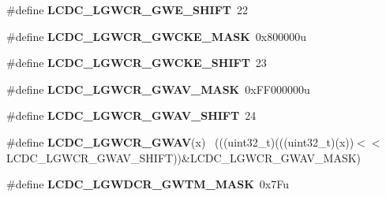 \begin{DoxyCompactItemize}
\item 
\hypertarget{group___l_c_d_c___register___masks_gac7cd7620653ddb327ec89e6070483ade}{}\#define {\bfseries L\+C\+D\+C\+\_\+\+L\+G\+W\+C\+R\+\_\+\+G\+W\+E\+\_\+\+S\+H\+I\+F\+T}~22\label{group___l_c_d_c___register___masks_gac7cd7620653ddb327ec89e6070483ade}

\item 
\hypertarget{group___l_c_d_c___register___masks_ga12aedf8fd9efa6392c6b3d59ccfdbf85}{}\#define {\bfseries L\+C\+D\+C\+\_\+\+L\+G\+W\+C\+R\+\_\+\+G\+W\+C\+K\+E\+\_\+\+M\+A\+S\+K}~0x800000u\label{group___l_c_d_c___register___masks_ga12aedf8fd9efa6392c6b3d59ccfdbf85}

\item 
\hypertarget{group___l_c_d_c___register___masks_ga6d308a14743182b61fa185c65b962bfd}{}\#define {\bfseries L\+C\+D\+C\+\_\+\+L\+G\+W\+C\+R\+\_\+\+G\+W\+C\+K\+E\+\_\+\+S\+H\+I\+F\+T}~23\label{group___l_c_d_c___register___masks_ga6d308a14743182b61fa185c65b962bfd}

\item 
\hypertarget{group___l_c_d_c___register___masks_ga1eb39ddae758eda0f99e646c0cd37b7f}{}\#define {\bfseries L\+C\+D\+C\+\_\+\+L\+G\+W\+C\+R\+\_\+\+G\+W\+A\+V\+\_\+\+M\+A\+S\+K}~0x\+F\+F000000u\label{group___l_c_d_c___register___masks_ga1eb39ddae758eda0f99e646c0cd37b7f}

\item 
\hypertarget{group___l_c_d_c___register___masks_ga196c91286d46afa0d51b2ed04366ef45}{}\#define {\bfseries L\+C\+D\+C\+\_\+\+L\+G\+W\+C\+R\+\_\+\+G\+W\+A\+V\+\_\+\+S\+H\+I\+F\+T}~24\label{group___l_c_d_c___register___masks_ga196c91286d46afa0d51b2ed04366ef45}

\item 
\hypertarget{group___l_c_d_c___register___masks_gaa2d7df9392b6b072400f33905b450d6c}{}\#define {\bfseries L\+C\+D\+C\+\_\+\+L\+G\+W\+C\+R\+\_\+\+G\+W\+A\+V}(x)                                          ~(((uint32\+\_\+t)(((uint32\+\_\+t)(x))$<$$<$L\+C\+D\+C\+\_\+\+L\+G\+W\+C\+R\+\_\+\+G\+W\+A\+V\+\_\+\+S\+H\+I\+F\+T))\&L\+C\+D\+C\+\_\+\+L\+G\+W\+C\+R\+\_\+\+G\+W\+A\+V\+\_\+\+M\+A\+S\+K)\label{group___l_c_d_c___register___masks_gaa2d7df9392b6b072400f33905b450d6c}

\item 
\hypertarget{group___l_c_d_c___register___masks_ga194e797bf443ba012ccc6d9b18aa7eb8}{}\#define {\bfseries L\+C\+D\+C\+\_\+\+L\+G\+W\+D\+C\+R\+\_\+\+G\+W\+T\+M\+\_\+\+M\+A\+S\+K}~0x7\+Fu\label{group___l_c_d_c___register___masks_ga194e797bf443ba012ccc6d9b18aa7eb8}


\end{DoxyCompactItemize}

